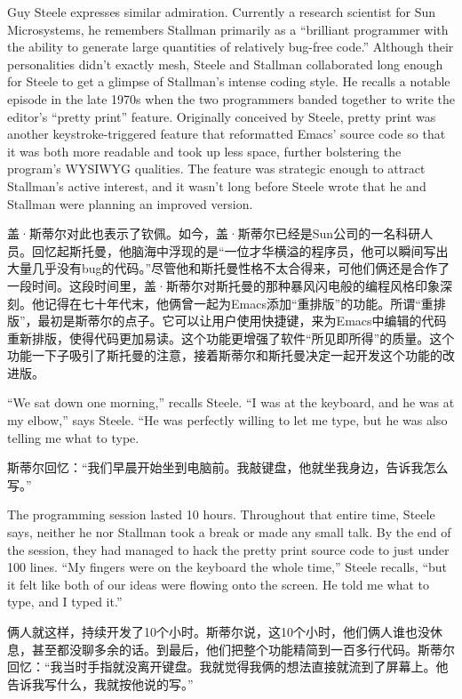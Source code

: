 \ifdefined\eng
Guy Steele expresses similar admiration. Currently a research scientist for Sun Microsystems, he remembers Stallman primarily as a ``brilliant programmer with the ability to generate large quantities of relatively bug-free code.'' Although their personalities didn't exactly mesh, Steele and Stallman collaborated long enough for Steele to get a glimpse of Stallman's intense coding style. He recalls a notable episode in the late 1970s when the two programmers banded together to write the editor's ``pretty print'' feature. Originally conceived by Steele, pretty print was another keystroke-triggered feature that reformatted Emacs' source code so that it was both more readable and took up less space, further bolstering the program's WYSIWYG qualities. The feature was strategic enough to attract Stallman's active interest, and it wasn't long before Steele wrote that he and Stallman were planning an improved version.
\fi

\ifdefined\chs
盖·斯蒂尔对此也表示了钦佩。如今，盖·斯蒂尔已经是Sun公司的一名科研人员。回忆起斯托曼，他脑海中浮现的是``一位才华横溢的程序员，他可以瞬间写出大量几乎没有bug的代码。''尽管他和斯托曼性格不太合得来，可他们俩还是合作了一段时间。这段时间里，盖·斯蒂尔对斯托曼的那种暴风闪电般的编程风格印象深刻。他记得在七十年代末，他俩曾一起为Emacs添加``重排版''的功能。所谓``重排版''，最初是斯蒂尔的点子。它可以让用户使用快捷键，来为Emacs中编辑的代码重新排版，使得代码更加易读。这个功能更增强了软件``所见即所得''的质量。这个功能一下子吸引了斯托曼的注意，接着斯蒂尔和斯托曼决定一起开发这个功能的改进版。
\fi

\ifdefined\eng
``We sat down one morning,'' recalls Steele. ``I was at the keyboard, and he was at my elbow,'' says Steele. ``He was perfectly willing to let me type, but he was also telling me what to type.
\fi

\ifdefined\chs
斯蒂尔回忆：``我们早晨开始坐到电脑前。我敲键盘，他就坐我身边，告诉我怎么写。''
\fi

\ifdefined\eng
The programming session lasted 10 hours. Throughout that entire time, Steele says, neither he nor Stallman took a break or made any small talk. By the end of the session, they had managed to hack the pretty print source code to just under 100 lines. ``My fingers were on the keyboard the whole time,'' Steele recalls, ``but it felt like both of our ideas were flowing onto the screen. He told me what to type, and I typed it.''
\fi

\ifdefined\chs
俩人就这样，持续开发了10个小时。斯蒂尔说，这10个小时，他们俩人谁也没休息，甚至都没聊多余的话。到最后，他们把整个功能精简到一百多行代码。斯蒂尔回忆：``我当时手指就没离开键盘。我就觉得我俩的想法直接就流到了屏幕上。他告诉我写什么，我就按他说的写。''
\fi

